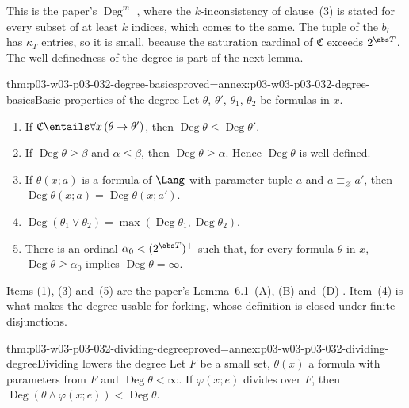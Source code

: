 This is the paper's \(\operatorname{Deg}^m\)
\cite[Definitions~6.1--6.3, pp.~347--348]{Shelah1971Stability}, where the
\(k\)-inconsistency of clause~(3) is stated for every subset of at least
\(k\) indices, which comes to the same.  The tuple of the \(b_l\) has
\(\kappa_T\) entries, so it is small, because the saturation cardinal of
\(\mathfrak C\) exceeds \(2^{\abs T}\).  The well-definedness of the degree
is part of the next lemma.

\begin{hblemma}{thm:p03-w03-p03-032-degree-basics}{proved=annex:p03-w03-p03-032-degree-basics}{Basic properties of the degree}
Let \(\theta\), \(\theta'\), \(\theta_1\), \(\theta_2\) be formulas in \(x\).
\begin{enumerate}
  \item If \(\mathfrak C\entails\forall x\,(\theta\to\theta')\), then
        \(\operatorname{Deg}\theta\leq\operatorname{Deg}\theta'\).
  \item If \(\operatorname{Deg}\theta\geq\beta\) and \(\alpha\leq\beta\),
        then \(\operatorname{Deg}\theta\geq\alpha\).  Hence
        \(\operatorname{Deg}\theta\) is well defined.
  \item If \(\theta(x;a)\) is a formula of \(\Lang\) with parameter tuple
        \(a\) and \(a\equiv_\varnothing a'\), then
        \(\operatorname{Deg}\theta(x;a)=\operatorname{Deg}\theta(x;a')\).
  \item \(\operatorname{Deg}(\theta_1\vee\theta_2)
        =\max(\operatorname{Deg}\theta_1,\operatorname{Deg}\theta_2)\).
  \item There is an ordinal \(\alpha_0<(2^{\abs T})^+\) such that, for every
        formula \(\theta\) in \(x\), \(\operatorname{Deg}\theta\geq\alpha_0\)
        implies \(\operatorname{Deg}\theta=\infty\).
\end{enumerate}
\end{hblemma}

Items (1), (3) and~(5) are the paper's Lemma~6.1~(A), (B) and~(D)
\cite[p.~348]{Shelah1971Stability}.  Item~(4) is what makes the degree
usable for forking, whose definition is closed under finite disjunctions.

\begin{hblemma}{thm:p03-w03-p03-032-dividing-degree}{proved=annex:p03-w03-p03-032-dividing-degree}{Dividing lowers the degree}
Let \(F\) be a small set, \(\theta(x)\) a formula with parameters from \(F\)
and \(\operatorname{Deg}\theta<\infty\).  If \(\varphi(x;e)\) divides over
\(F\), then
\(\operatorname{Deg}(\theta\wedge\varphi(x;e))<\operatorname{Deg}\theta\).
\end{hblemma}

